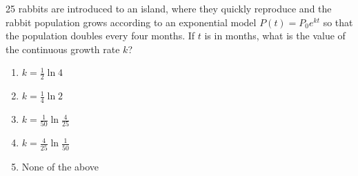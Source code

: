 \bigskip

\item 25 rabbits are introduced to an island, where they quickly reproduce and the rabbit population grows according to an exponential model $P(t) = P_0 e^{kt}$ so that the population doubles every four months.  If $t$ is in months, what is the value of the continuous growth rate $k$?

\begin{enumerate}
\item $k = \frac{1}{2} \ln 4$
\item $k = \frac{1}{4} \ln 2$
\item $k = \frac{1}{50} \ln \frac{4}{25}$
\item $k = \frac{4}{25} \ln \frac{1}{50}$
\item None of the above
\end{enumerate}

